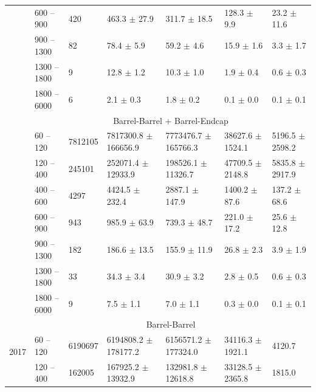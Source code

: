 \begin{table}[!htbp]
\begin{center}
{\begin{tabular}{|l|l|l|l|l|l|l|}
& 600   -- 900   & 420         & 463.3      $\pm$ 27.9     & 311.7      $\pm$ 18.5             & 128.3      $\pm$ 9.9       & 23.2       $\pm$ 11.6     \\
& 900   -- 1300  & 82          & 78.4       $\pm$ 5.9      & 59.2       $\pm$ 4.6              & 15.9       $\pm$ 1.6       & 3.3        $\pm$ 1.7      \\
& 1300  -- 1800  & 9           & 12.8       $\pm$ 1.2      & 10.3       $\pm$ 1.0              & 1.9        $\pm$ 0.4       & 0.6        $\pm$ 0.3      \\
& 1800  -- 6000  & 6           & 2.1        $\pm$ 0.3      & 1.8        $\pm$ 0.2              & 0.1        $\pm$ 0.0       & 0.1        $\pm$ 0.1      \\ \cline{2-7}
&\multicolumn{6}{c|}{Barrel-Barrel + Barrel-Endcap} \\ \cline{2-7}
& 60    -- 120   & 7812105     & 7817300.8  $\pm$ 166656.9 & 7773476.7  $\pm$ 165766.3         & 38627.6    $\pm$ 1524.1    & 5196.5     $\pm$ 2598.2   \\
& 120   -- 400   & 245101      & 252071.4   $\pm$ 12933.9  & 198526.1   $\pm$ 11326.7          & 47709.5    $\pm$ 2148.8    & 5835.8     $\pm$ 2917.9   \\
& 400   -- 600   & 4297        & 4424.5     $\pm$ 232.4    & 2887.1     $\pm$ 147.9            & 1400.2     $\pm$ 87.6      & 137.2      $\pm$ 68.6     \\
& 600   -- 900   & 943         & 985.9      $\pm$ 63.9     & 739.3      $\pm$ 48.7             & 221.0      $\pm$ 17.2      & 25.6       $\pm$ 12.8     \\
& 900   -- 1300  & 182         & 186.6      $\pm$ 13.5     & 155.9      $\pm$ 11.9             & 26.8       $\pm$ 2.3       & 3.9        $\pm$ 1.9      \\
& 1300  -- 1800  & 33          & 34.3       $\pm$ 3.4      & 30.9       $\pm$ 3.2              & 2.8        $\pm$ 0.5       & 0.6        $\pm$ 0.3      \\
& 1800  -- 6000  & 9           & 7.5        $\pm$ 1.1      & 7.0        $\pm$ 1.1              & 0.3        $\pm$ 0.0       & 0.1        $\pm$ 0.1      \\  \cline{2-7} \hline \hline
\multirow{24}{*}{2017}& \multicolumn{6}{c|}{Barrel-Barrel} \\ \cline{2-7}
& 60    -- 120   & 6190697        & 6194808.2  $\pm$ 178177.2   & 6156571.2  $\pm$ 177324.0         & 34116.3    $\pm$ 1921.1           & 4120.7      \\
& 120   -- 400   & 162005         & 167925.2   $\pm$ 13932.9    & 132981.8   $\pm$ 12618.8          & 33128.5    $\pm$ 2365.8           & 1815.0      \\

\end{tabular}}
\end{center}
\end{table}
